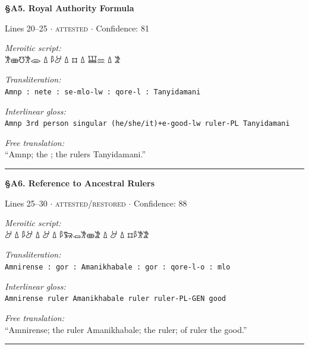 \documentclass[11pt,a4paper]{article}
\begin{document}
{{{{\vspace{6pt}
\noindent\textbf{\S A5. Royal Authority Formula}
\hfill {\small Lines 20–25 $\cdot$ \textsc{attested} $\cdot$ Confidence: 81%

\vspace{3pt}
\noindent\textit{Meroitic script:}\\[2pt]
{\meroitic 𐦀 𐦗 𐦊𐦓 𐦗 𐦕 𐦗 𐦃𐦁 𐦗 𐦑𐦂𐦒𐦈𐦂}

\vspace{4pt}
\noindent\textit{Transliteration:}\\[2pt]
\texttt{Amnp : nete : se-mlo-lw : qore-l : Tanyidamani}

\vspace{4pt}
\noindent\textit{Interlinear gloss:}\\[2pt]
{\small\texttt{Amnp    3rd person singular (he/she/it)+e-good-lw  ruler-PL  Tanyidamani}}

\vspace{4pt}
\noindent\textit{Free translation:}\\[2pt]
``Amnp; the ; the rulers Tanyidamani.''

\vspace{2pt}
\noindent\rule{\textwidth}{0.3pt}


\vspace{6pt}
\noindent\textbf{\S A6. Reference to Ancestral Rulers}
\hfill {\small Lines 25–30 $\cdot$ \textsc{attested/restored} $\cdot$ Confidence: 88%

\vspace{3pt}
\noindent\textit{Meroitic script:}\\[2pt]
{\meroitic 𐦀𐦂𐦁𐦕 𐦗 𐦃 𐦗 𐦀𐦈𐦂𐦎𐦆𐦁 𐦗 𐦃 𐦗 𐦃𐦁 𐦗 𐦃}

\vspace{4pt}
\noindent\textit{Transliteration:}\\[2pt]
\texttt{Amnirense : gor : Amanikhabale : gor : qore-l-o : mlo}

\vspace{4pt}
\noindent\textit{Interlinear gloss:}\\[2pt]
{\small\texttt{Amnirense  ruler  Amanikhabale  ruler  ruler-PL-GEN  good}}

\vspace{4pt}
\noindent\textit{Free translation:}\\[2pt]
``Amnirense; the ruler Amanikhabale; the ruler; of ruler the good.''

\vspace{2pt}
\noindent\rule{\textwidth}{0.3pt}


}}}}}}
\end{document}
